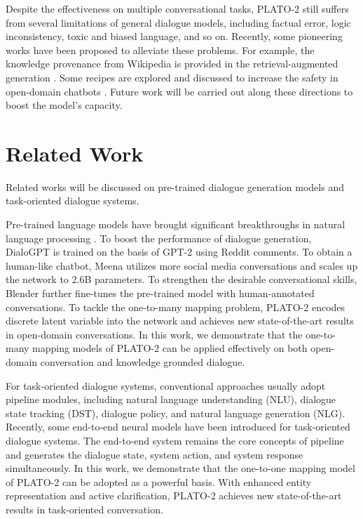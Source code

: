 \documentclass[letterpaper]{article} \usepackage{aaai21}  \usepackage{times}  \usepackage{helvet} \usepackage{courier}  \usepackage[hyphens]{url}  \usepackage{graphicx} \urlstyle{rm} \def\UrlFont{\rm}  \usepackage{natbib}  \usepackage{caption} \frenchspacing  \setlength{\pdfpagewidth}{8.5in}  \setlength{\pdfpageheight}{11in}  \usepackage{amsmath}
\begin{document}
Despite the effectiveness on multiple conversational tasks, PLATO-2 still suffers from several limitations of general dialogue models, including factual error, logic inconsistency, toxic and biased language, and so on. Recently, some pioneering works have been proposed to alleviate these problems. For example, the knowledge provenance from Wikipedia is provided in the retrieval-augmented generation \cite{lewis2020retrieval}. Some recipes are explored and discussed to increase the safety in open-domain chatbots \cite{xu2020recipes}. Future work will be carried out along these directions to boost the model's capacity. 

\section{Related Work}
Related works will be discussed on pre-trained dialogue generation models and task-oriented dialogue systems. 

Pre-trained language models have brought significant breakthroughs in natural language processing \cite{devlin2019bert, radford2019language, brown2020language}. To boost the performance of dialogue generation, DialoGPT \cite{zhang2019dialogpt} is trained on the basis of GPT-2 \cite{radford2019language} using Reddit comments. To obtain a human-like chatbot, Meena \cite{adiwardana2020towards} utilizes more social media conversations and scales up the network to 2.6B parameters. To strengthen the desirable conversational skills, Blender \cite{roller2020recipes} further fine-tunes the pre-trained model with human-annotated conversations. To tackle the one-to-many mapping problem, PLATO-2 \cite{bao2020plato} encodes discrete latent variable into the network and achieves new state-of-the-art results in open-domain conversations. In this work, we demonstrate that the one-to-many mapping models of PLATO-2 can be applied effectively on both open-domain conversation and knowledge grounded dialogue.

For task-oriented dialogue systems, conventional approaches \cite{young2013pomdp, henderson2014second, wen2015semantically} usually adopt pipeline modules, including natural language understanding (NLU), dialogue state tracking (DST), dialogue policy, and natural language generation (NLG). Recently, some end-to-end neural models \cite{wen2017network, ham2020end, peng2020soloist} have been introduced for task-oriented dialogue systems. The end-to-end system \cite{ham2020end} remains the core concepts of pipeline and generates the dialogue state, system action, and system response simultaneously. In this work, we demonstrate that the one-to-one mapping model of PLATO-2 can be adopted as a powerful basis. With enhanced entity representation and active clarification, PLATO-2 achieves new state-of-the-art results in task-oriented conversation.
\end{document}
